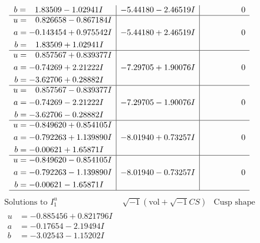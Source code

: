 \documentclass[1p]{elsarticle_modified}
\theoremstyle{definition}
\newcommand{\I}{\sqrt{-1}}
\begin{document}
$$\begin{array}{c|c|c}
\begin{aligned}
b &= \phantom{-}1.83509 - 1.02941 I\end{aligned}
 & -5.44180 - 2.46519 I & \phantom{-0.000000 } 0 \\ \hline\begin{aligned}
u &= \phantom{-}0.826658 - 0.867184 I \\
a &= -0.143454 + 0.975542 I \\
b &= \phantom{-}1.83509 + 1.02941 I\end{aligned}
 & -5.44180 + 2.46519 I & \phantom{-0.000000 } 0 \\ \hline\begin{aligned}
u &= \phantom{-}0.857567 + 0.839377 I \\
a &= -0.74269 + 2.21222 I \\
b &= -3.62706 + 0.28882 I\end{aligned}
 & -7.29705 + 1.90076 I & \phantom{-0.000000 } 0 \\ \hline\begin{aligned}
u &= \phantom{-}0.857567 - 0.839377 I \\
a &= -0.74269 - 2.21222 I \\
b &= -3.62706 - 0.28882 I\end{aligned}
 & -7.29705 - 1.90076 I & \phantom{-0.000000 } 0 \\ \hline\begin{aligned}
u &= -0.849620 + 0.854105 I \\
a &= -0.792263 + 1.139890 I \\
b &= -0.00621 + 1.65871 I\end{aligned}
 & -8.01940 + 0.73257 I & \phantom{-0.000000 } 0 \\ \hline\begin{aligned}
u &= -0.849620 - 0.854105 I \\
a &= -0.792263 - 1.139890 I \\
b &= -0.00621 - 1.65871 I\end{aligned}
 & -8.01940 - 0.73257 I & \phantom{-0.000000 } 0\\
 \hline 
 \end{array}$$\newpage$$\begin{array}{c|c|c}  
\text{Solutions to }I^u_{1}& \I (\text{vol} + \sqrt{-1}CS) & \text{Cusp shape}\\
 \hline 
\begin{aligned}
u &= -0.885456 + 0.821796 I \\
a &= -0.17654 - 2.19494 I \\
b &= -3.02543 - 1.15202 I\end{aligned}

\end{array}$$
\end{document}
